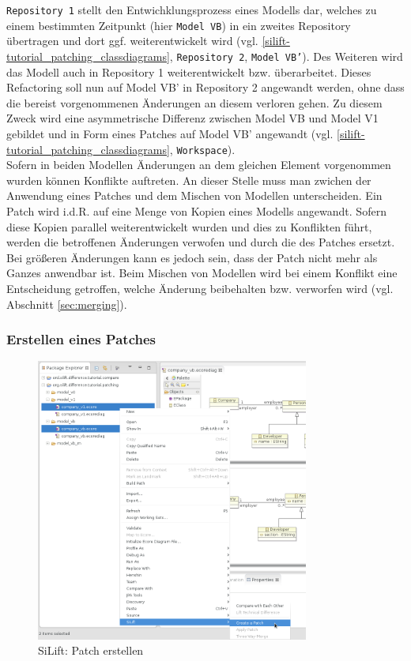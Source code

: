 \documentclass[a4paper]{scrartcl}
\begin{document}
\texttt{Repository 1} stellt den Entwichklungsprozess eines Modells dar, welches zu einem bestimmten Zeitpunkt (hier \texttt{Model VB}) in ein zweites Repository übertragen und dort ggf. weiterentwickelt wird (vgl. \ref{silift-tutorial_patching_classdiagrams}, \texttt{Repository 2}, \texttt{Model VB'}). 
Des Weiteren wird das Modell auch in Repository 1 weiterentwickelt bzw. überarbeitet.
Dieses Refactoring soll nun auf Model VB' in Repository 2 angewandt werden, ohne dass die bereist vorgenommenen Änderungen an diesem verloren gehen.
Zu diesem Zweck wird eine asymmetrische Differenz zwischen Model VB und Model V1 gebildet und in Form eines Patches auf Model VB' angewandt (vgl. \ref{silift-tutorial_patching_classdiagrams}, \texttt{Workspace}).\\
Sofern in beiden Modellen Änderungen an dem gleichen Element vorgenommen wurden können Konflikte auftreten. 
An dieser Stelle muss man zwichen der Anwendung eines Patches und dem Mischen von Modellen unterscheiden.
Ein Patch wird i.d.R. auf eine Menge von Kopien eines Modells angewandt.
Sofern diese Kopien parallel weiterentwickelt wurden und dies zu Konflikten führt, werden die betroffenen Änderungen verwofen und durch die des Patches ersetzt.
Bei größeren Änderungen kann es jedoch sein, dass der Patch nicht mehr als Ganzes anwendbar ist. 
Beim Mischen von Modellen wird bei einem Konflikt eine Entscheidung getroffen, welche Änderung beibehalten bzw. verworfen wird (vgl. Abschnitt \ref{sec:merging}).\\

\subsubsection{Erstellen eines Patches}

\begin{figure}[H]
\centering
\includegraphics[width=0.8\textwidth]{graphics/silift-tutorial_patching_contextmenu_create.png}
\caption{SiLift: Patch erstellen}
\label{silift-tutorial_patching_contextmenu_create}
\end{figure}
\end{document}
